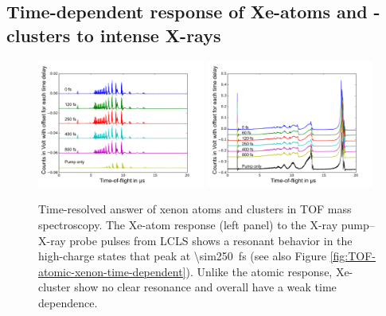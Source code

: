 \subsection{Time-dependent response of Xe-atoms and -clusters to intense X-rays}\label{sec:time-resolved-xe-atoms}
\begin{figure}
	\centering
		\includegraphics[width=0.49\textwidth]{images/results/TOF-atomic-xenon2.png}
		\includegraphics[width=0.49\textwidth]{images/results/TOF-regular-cluster-xenon2.png}
	\caption[Time-resolved answer of xenon atoms and clusters in TOF spectroscopy.]{Time-resolved answer of xenon atoms and clusters in TOF mass spectroscopy. The Xe-atom response (left panel) to the X-ray pump--X-ray probe pulses from LCLS shows a resonant behavior in the high-charge states that peak at \SI{\sim250}{\femto\second} (see also Figure \ref{fig:TOF-atomic-xenon-time-dependent}). Unlike the atomic response, Xe-cluster show no clear resonance and overall have a weak time dependence.}
	\label{fig:TOF-traces-xenon}
\end{figure}

